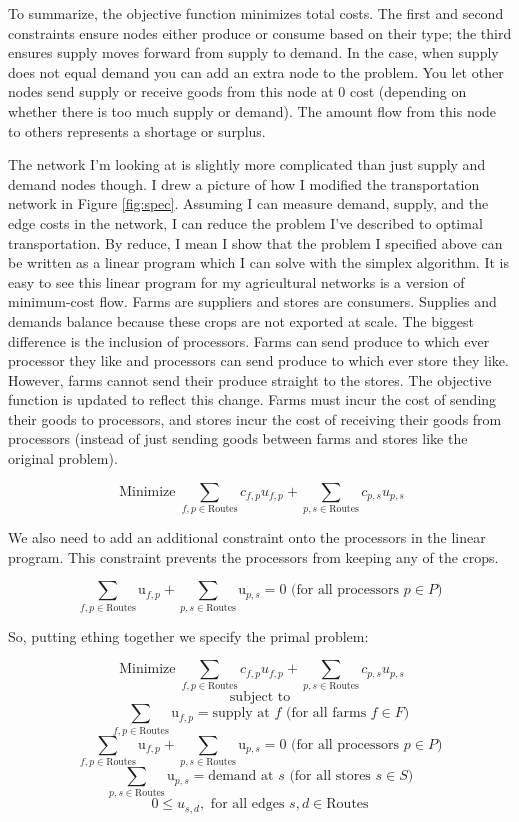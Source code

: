 \documentclass{report}
\begin{document}
To summarize, the objective function minimizes total costs. The first and second constraints ensure nodes either produce or consume based on their type; the third ensures supply moves forward from supply to demand.  In the case, when supply does not equal demand you can add an extra node to the problem. You let other nodes send supply or receive goods from this node at 0 cost (depending on whether there is too much supply or demand). The amount flow from this node to others represents a shortage or surplus.


The network I'm looking at is slightly more complicated than just supply and demand nodes though. I drew a picture of how I modified the transportation network in Figure \ref{fig:spec}. Assuming I can measure demand, supply, and the edge costs in the network, I can reduce the problem I've described to optimal transportation. By reduce, I mean I show that the problem I specified above can be written as a linear program which I can solve with the simplex algorithm. It is easy to see this linear program for my agricultural networks is a version of minimum-cost flow. Farms are suppliers and stores are consumers. Supplies and demands balance because these crops are not exported at scale. The biggest difference is the inclusion of processors. Farms can send produce to which ever processor they like and processors can send produce to which ever store they like. However, farms cannot send their produce straight to the stores. The objective function is updated to reflect this change. Farms must incur the cost of sending their goods to processors, and stores incur the cost of receiving their goods from processors (instead of just sending goods between farms and stores like the original problem).

$$\operatorname{Minimize} \sum_{f,p \in \text{Routes}} c_{f,p} u_{f,p} + \sum_{p,s \in \text{Routes}} c_{p,s} u_{p,s}$$

We also need to add an additional constraint onto the processors in the linear program. This constraint prevents the processors from keeping any of the crops.

$$\sum_{f,p \in \text{Routes}} \text{u}_{f,p} + \sum_{p,s \in \text{Routes}} \text{u}_{p,s} = 0 \text{ (for all processors } p \in P)$$

So, putting ething together we specify the primal problem:

$$\operatorname{Minimize} \sum_{f,p \in \text{Routes}} c_{f,p} u_{f,p} + \sum_{p,s \in \text{Routes}} c_{p,s} u_{p,s}$$
$$\text{subject to}$$
$$\sum_{f,p \in \text{Routes}} \text{u}_{f,p}= \text{supply at } f \text{ (for all farms } f \in F)$$
$$\sum_{f,p \in \text{Routes}} \text{u}_{f,p} + \sum_{p,s \in \text{Routes}} \text{u}_{p,s} = 0 \text{ (for all processors } p \in P)$$
$$\sum_{p,s \in \text{Routes}} \text{u}_{p,s}= \text{demand at } s \text{ (for all stores } s \in S)$$
$$0 \leq u_{s,d}, \text{ for all edges } s,d \in \text{Routes}$$
\end{document}
